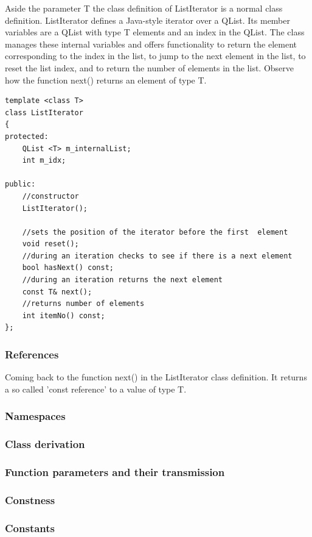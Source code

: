 \documentclass{article}
\begin{document}
Aside the parameter T the class definition of ListIterator is a normal class definition. ListIterator defines a Java-style iterator over a QList. Its member variables are a QList with type T elements and an index in the QList. The class manages these internal variables and offers functionality to return the element corresponding to the index in the list, to jump to the next element in the list, to reset the list index, and to return the number of elements in the list. Observe how the function next() returns an element of type T.

\begin{lstlisting}
template <class T>
class ListIterator
{
protected:
    QList <T> m_internalList;
    int m_idx;

public:
    //constructor
    ListIterator();

    //sets the position of the iterator before the first  element
    void reset();
    //during an iteration checks to see if there is a next element
    bool hasNext() const;
    //during an iteration returns the next element
    const T& next();
    //returns number of elements
    int itemNo() const;
};
\end{lstlisting}

\subsubsection {References}

Coming back to the function next() in the ListIterator class definition. It returns a so called 'const reference' to a value of type T.

\subsubsection {Namespaces}
\subsubsection {Class derivation}
\subsubsection {Function parameters and their transmission}
\subsubsection {Constness}
\subsubsection {Constants}
\end{document}
